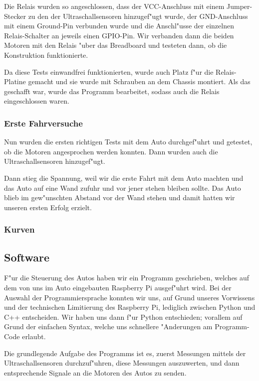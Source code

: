 \documentclass[a4paper,12pt]{article}
\begin{document}
Die Relais wurden so angeschlossen, dass der VCC-Anschluss mit einem Jumper-Stecker zu den der Ultraschallsensoren hinzugef"ugt wurde, der GND-Anschluss mit einem Ground-Pin verbunden wurde und die Anschl"usse der einzelnen Relais-Schalter an jeweils einen GPIO-Pin.
Wir verbanden dann die beiden Motoren mit den Relais "uber das Breadboard und testeten dann, ob die Konstruktion funktionierte.

Da diese Tests einwandfrei funktionierten, wurde auch Platz f"ur die Relais-Platine gemacht und sie wurde mit Schrauben an dem Chassis montiert.
Als das geschafft war, wurde das Programm bearbeitet, sodass auch die Relais eingeschlossen waren.

\subsubsection{Erste Fahrversuche}\label{sec2.1.5}

Nun wurden die ersten richtigen Tests mit dem Auto durchgef"uhrt und getestet, ob die Motoren angesprochen werden konnten. Dann wurden auch die Ultraschallsensoren hinzugef"ugt.

Dann stieg die Spannung, weil wir die erste Fahrt mit dem Auto machten und das Auto auf eine Wand zufuhr und vor jener stehen bleiben sollte. Das Auto blieb im gew"unschten Abstand vor der Wand stehen und damit hatten wir unseren ersten Erfolg erzielt.

\subsubsection{Kurven}\label{sec2.1.6}

\subsection{Software}\label{sec2.2}

F"ur die Steuerung des Autos haben wir ein Programm geschrieben, welches auf dem von uns im Auto eingebauten Raspberry Pi ausgef"uhrt wird.
Bei der Auswahl der Programmiersprache konnten wir uns, auf Grund unseres Vorwissens und der technischen Limitierung des Raspberry Pi, lediglich zwischen Python und C++ entscheiden.
Wir haben uns dann f"ur Python entschieden; vorallem auf Grund der einfachen Syntax, welche uns schnellere "Anderungen am Programm-Code erlaubt.

Die grundlegende Aufgabe des Programms ist es, zuerst Messungen mittels der Ultraschallsensoren durchzuf"uhren, diese Messungen auszuwerten, und dann entsprechende Signale an die Motoren des Autos zu senden.
\end{document}
